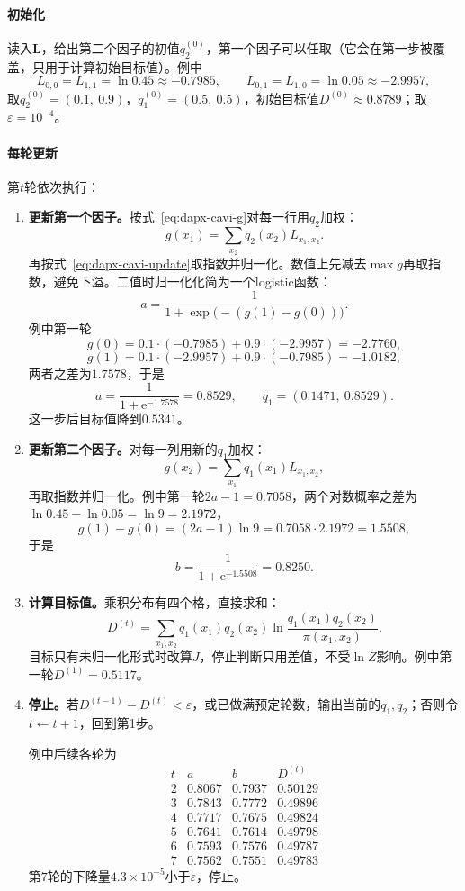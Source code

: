 \paragraph{初始化}
读入$\bm{L}$，给出第二个因子的初值$q_2^{(0)}$，第一个因子可以任取（它会在第一步被覆盖，只用于计算初始目标值）。例中
\[
 L_{0,0}=L_{1,1}=\ln0.45\approx-0.7985,\qquad L_{0,1}=L_{1,0}=\ln0.05\approx-2.9957 ,
\]
取$q_2^{(0)}=(0.1,\ 0.9)$，$q_1^{(0)}=(0.5,\ 0.5)$，初始目标值$D^{(0)}\approx0.8789$；取$\varepsilon=10^{-4}$。

\paragraph{每轮更新}
第$t$轮依次执行：
\begin{enumerate}
 \item \textbf{更新第一个因子。}按式~\eqref{eq:dapx-cavi-g}对每一行用$q_2$加权：
 \[
  g(x_1)=\sum_{x_2}q_2(x_2)L_{x_1,x_2} .
 \]
 再按式~\eqref{eq:dapx-cavi-update}取指数并归一化。数值上先减去$\max g$再取指数，避免下溢。二值时归一化化简为一个logistic函数：
 \[
  a=\frac{1}{1+\exp\bigl(-(g(1)-g(0))\bigr)} .
 \]
 例中第一轮
 \[
  g(0)=0.1\cdot(-0.7985)+0.9\cdot(-2.9957)=-2.7760 ,
 \]
 \[
  g(1)=0.1\cdot(-2.9957)+0.9\cdot(-0.7985)=-1.0182 ,
 \]
 两者之差为$1.7578$，于是
 \[
  a=\frac{1}{1+\mathrm{e}^{-1.7578}}=0.8529,\qquad q_1=(0.1471,\ 0.8529) .
 \]
 这一步后目标值降到$0.5341$。

 \item \textbf{更新第二个因子。}对每一列用新的$q_1$加权：
 \[
  g(x_2)=\sum_{x_1}q_1(x_1)L_{x_1,x_2} ,
 \]
 再取指数并归一化。例中第一轮$2a-1=0.7058$，两个对数概率之差为$\ln0.45-\ln0.05=\ln9=2.1972$，
 \[
  g(1)-g(0)=(2a-1)\ln9=0.7058\cdot2.1972=1.5508 ,
 \]
 于是
 \[
  b=\frac{1}{1+\mathrm{e}^{-1.5508}}=0.8250 .
 \]

 \item \textbf{计算目标值。}乘积分布有四个格，直接求和：
 \[
  D^{(t)}=\sum_{x_1,x_2}q_1(x_1)q_2(x_2)\ln\frac{q_1(x_1)q_2(x_2)}{\pi(x_1,x_2)} .
 \]
 目标只有未归一化形式时改算$J$，停止判断只用差值，不受$\ln Z$影响。例中第一轮$D^{(1)}=0.5117$。

 \item \textbf{停止。}若$D^{(t-1)}-D^{(t)}<\varepsilon$，或已做满预定轮数，输出当前的$q_1,q_2$；否则令$t\leftarrow t+1$，回到第1步。

 例中后续各轮为
 \[
  \begin{array}{cccc}
  t & a & b & D^{(t)}\\
  2 & 0.8067 & 0.7937 & 0.50129\\
  3 & 0.7843 & 0.7772 & 0.49896\\
  4 & 0.7717 & 0.7675 & 0.49824\\
  5 & 0.7641 & 0.7614 & 0.49798\\
  6 & 0.7593 & 0.7576 & 0.49787\\
  7 & 0.7562 & 0.7551 & 0.49783
  \end{array}
 \]
 第$7$轮的下降量$4.3\times10^{-5}$小于$\varepsilon$，停止。
\end{enumerate}

